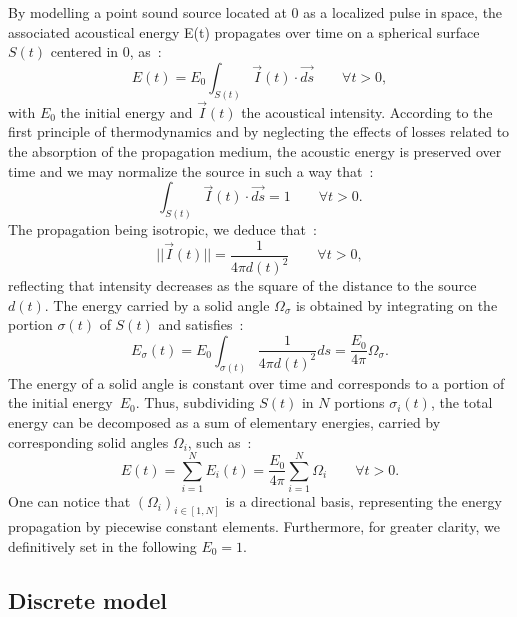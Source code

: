 \documentclass{aes2e}
\begin{document}
By modelling a point sound source located at 0 as a localized pulse in space, the associated acoustical energy E(t) propagates \cite{jouhaneau} over time on a spherical surface $S(t)$ centered in 0, as~:
%
\begin{equation} 
E(t) = E_0 \int_{S(t)} \overrightarrow{I}(t)\cdot\overrightarrow{ds} \qquad \forall t > 0,
\end{equation}
%
with $E_0$ the initial energy and $\overrightarrow{I}(t)$ the acoustical intensity. According to the first principle of thermodynamics and by neglecting the effects of losses related to the absorption of the propagation medium, the acoustic energy is preserved over time and we may normalize the source in such a way that~:
%
\begin{equation} 
\int_{S(t)} \overrightarrow{I}(t)\cdot\overrightarrow{ds} = 1 \qquad \forall t > 0.
\label{eq_2}
\end{equation}
%
The propagation being isotropic, we deduce that~:
\begin{equation} 
|| \overrightarrow{I}(t) || = \frac{1}{4\pi d(t)^2} \qquad \forall t > 0,
\end{equation}
%
reflecting that intensity decreases as the square of the distance to the source $d(t)$. The energy carried by a solid angle $\Omega_{\sigma}$ is obtained by integrating on the portion $\sigma(t)$ of $S(t)$ and satisfies~:
%
\begin{equation}
E_{\sigma}(t) = E_0 \int_{\sigma(t)}  \frac{1}{4\pi  d(t)^2} ds = \frac{E_0}{4\pi}  \Omega_{\sigma}.
\label{eq_4}
\end{equation}
%
The energy of a solid angle is constant over time and corresponds to a portion of the initial energy~$E_0$. Thus, subdividing $S(t)$ in $N$ portions $\sigma_i(t)$, the total energy can be decomposed as a sum of elementary energies, carried by corresponding solid angles $\Omega_i$, such as~: 
%
\begin{equation}
E(t) = \sum_{i=1}^N E_i(t) = \frac{E_0}{4\pi}  \sum_{i=1}^N \Omega_i  \qquad \forall t > 0.
\label{eq_5}
\end{equation}
One can notice that $(\Omega_i)_{i\in[1,N] }$ is a directional basis, representing the energy propagation by piecewise constant elements. Furthermore, for greater clarity, we definitively set in the following $E_0 = 1$.

\subsection{Discrete model}
\end{document}
